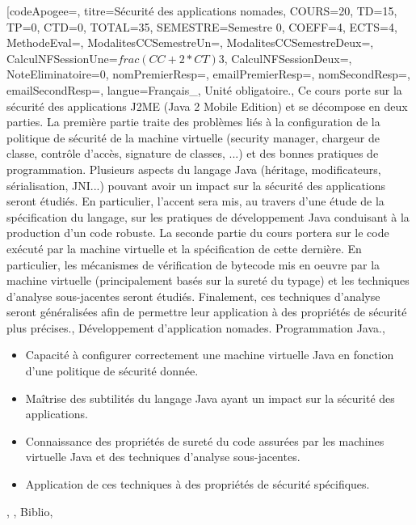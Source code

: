 \module[codeApogee={},
titre={Sécurité des applications nomades},
COURS={20},
TD={15},
TP={0},
CTD={0},
TOTAL={35},
SEMESTRE={Semestre 0},
COEFF={4},
ECTS={4},
MethodeEval={},
ModalitesCCSemestreUn={},
ModalitesCCSemestreDeux={},
CalculNFSessionUne={$frac{(CC+2*CT)}{3}$},
CalculNFSessionDeux={},
NoteEliminatoire={0},
nomPremierResp={},
emailPremierResp={},
nomSecondResp={},
emailSecondResp={},
langue={Français_},
{Unité obligatoire.},
{Ce cours porte sur la sécurité des applications J2ME (Java 2 Mobile Edition) et se décompose en deux parties.
La première partie traite des problèmes liés à la configuration de la politique de sécurité de la machine virtuelle
(security manager, chargeur de classe, contrôle  d'accès, signature de classes, ...) et des bonnes pratiques de programmation.
Plusieurs aspects du langage Java (héritage, modificateurs,   sérialisation, JNI...) pouvant avoir un impact sur la sécurité des  applications seront étudiés.
En particulier, l'accent sera mis, au travers d'une étude de la spécification du langage, sur les pratiques de développement Java conduisant à la production d'un code robuste.
La seconde partie du cours portera sur le code exécuté par la machine virtuelle et la spécification de cette dernière.
En particulier, les mécanismes de vérification de bytecode mis en oeuvre par la machine virtuelle (principalement basés sur la sureté du typage)
et les techniques d'analyse sous-jacentes seront étudiés. Finalement, ces techniques d'analyse seront généralisées afin de permettre
leur application à des propriétés de sécurité plus précises.},
{Développement d'application nomades.
Programmation Java.},
{\begin{itemize}
\item Capacité à configurer correctement une machine virtuelle Java en fonction d'une politique de sécurité donnée.
\item Maîtrise des subtilités du langage Java ayant un impact sur la sécurité des applications.
\item Connaissance des propriétés de sureté du code assurées par les machines virtuelle Java et des techniques d'analyse sous-jacentes.
\item Application de ces techniques à des propriétés de sécurité spécifiques.
\end{itemize}},
{},
{Biblio},

\vfill



